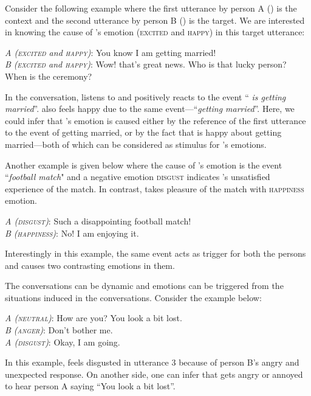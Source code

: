 \documentclass[11pt,a4paper]{article}
\theoremstyle{definition}
\newcommand\emo[1]{\textsc{#1}}
\begin{document}
Consider the following example where the first utterance by person A () is the context and the second utterance by person B () is the target. We are interested in knowing the cause of 's emotion (\emo{excited} and \emo{happy}) in this target utterance:

\begin{exe}
\ex \textit{A (\emo{excited} and \emo{happy})}: You know I am getting married!\\
\textit{B (\emo{excited} and \emo{happy})}: Wow! that's great news. Who is that lucky person? When is the ceremony?
\end{exe}

In the conversation,  listens to and positively reacts to the event ``\textit{ is getting married}''.  also feels happy due to the same event---``\textit{getting married}''. Here, we could infer that 's emotion is caused either by the reference of the first utterance to the event of getting married, or by the fact that  is happy about getting married---both of which can be considered as stimulus for 's emotions. 

Another example is given below where the cause of 's emotion is the event ``\textit{football match}" and a negative emotion \emo{disgust} indicates 's unsatisfied experience of the match. In contrast,  takes pleasure of the match with \emo{happiness} emotion. 
\begin{exe}
\ex \textit{A (\emo{disgust})}: Such a disappointing football match!\\
\textit{B (\emo{happiness})}: No! I am enjoying it.
\end{exe}
Interestingly in this example, the same event acts as trigger for both the persons and causes two contrasting emotions in them.

The conversations can be dynamic and emotions can be triggered from the situations induced in the conversations. Consider the example below:
\begin{exe}
\ex \textit{A (\emo{neutral})}: How are you? You look a bit lost.\\
\textit{B (\emo{anger})}: Don't bother me.\\
\textit{A (\emo{disgust})}: Okay, I am going.
\label{ex:1}
\end{exe}

In this example,  feels disgusted in utterance 3 because of person B's angry and unexpected response. On another side, one can infer that  gets angry or annoyed to hear person A saying ``You look a bit lost''.
\end{document}
